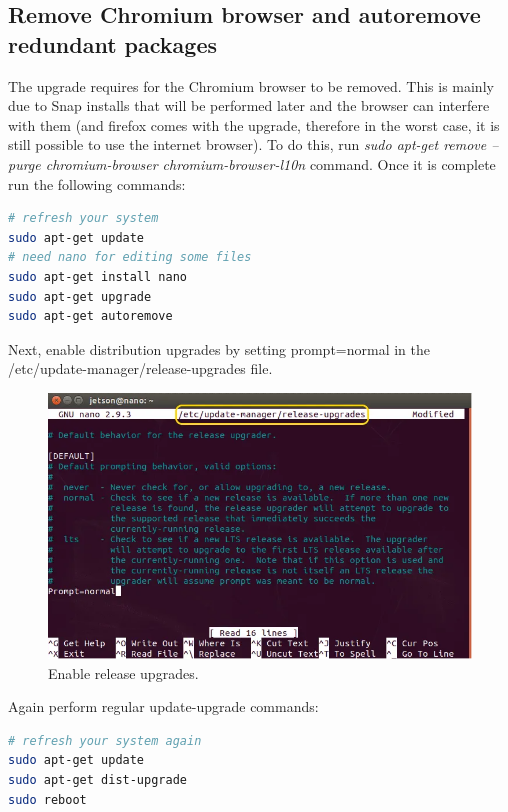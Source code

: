 \subsection{Remove Chromium browser and autoremove redundant packages}
The upgrade requires for the Chromium browser to be removed. This is mainly due to Snap installs that will be performed later and the browser can interfere with them (and firefox comes with the upgrade, therefore in the worst case, it is still possible to use the internet browser). To do this, run \textit{sudo apt-get remove --purge chromium-browser chromium-browser-l10n} command. Once it is complete run the following commands:
\begin{lstlisting}[language=bash, belowskip=-0.8 \baselineskip]
# refresh your system
sudo apt-get update
# need nano for editing some files
sudo apt-get install nano
sudo apt-get upgrade
sudo apt-get autoremove
\end{lstlisting}
Next, enable distribution upgrades by setting prompt=normal in the /etc/update-manager/release-upgrades file.
\begin{figure}[h]
    \centering
    \includegraphics[width=\textwidth]{figures/os_upgrades/distribution_upgrades.PNG}
    \caption{Enable release upgrades.}
    \label{dist_upgrade}
\end{figure}
Again perform regular update-upgrade commands:
\begin{lstlisting}[language=bash, belowskip=-0.8 \baselineskip]
# refresh your system again
sudo apt-get update
sudo apt-get dist-upgrade
sudo reboot
\end{lstlisting}
